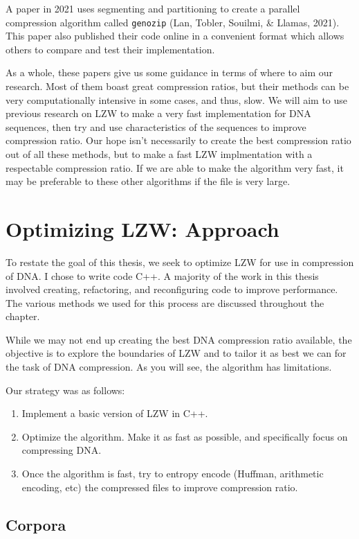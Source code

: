 \documentclass[12pt,twoside]{reedthesis}
\providecommand{\tightlist}{%
  \setlength{\itemsep}{0pt}\setlength{\parskip}{0pt}}
\begin{document}
A paper in 2021 uses segmenting and partitioning to create a parallel compression algorithm called \texttt{genozip} (Lan, Tobler, Souilmi, \& Llamas, 2021). This paper also published their code online in a convenient format which allows others to compare and test their implementation.

As a whole, these papers give us some guidance in terms of where to aim our research. Most of them boast great compression ratios, but their methods can be very computationally intensive in some cases, and thus, slow. We will aim to use previous research on LZW to make a very fast implementation for DNA sequences, then try and use characteristics of the sequences to improve compression ratio. Our hope isn't necessarily to create the best compression ratio out of all these methods, but to make a fast LZW implmentation with a respectable compression ratio. If we are able to make the algorithm very fast, it may be preferable to these other algorithms if the file is very large.

\hypertarget{optimizing-lzw-approach}{%
\chapter{Optimizing LZW: Approach}\label{optimizing-lzw-approach}}

To restate the goal of this thesis, we seek to optimize LZW for use in compression of DNA. I chose to write code C++. A majority of the work in this thesis involved creating, refactoring, and reconfiguring code to improve performance. The various methods we used for this process are discussed throughout the chapter.

While we may not end up creating the best DNA compression ratio available, the objective is to explore the boundaries of LZW and to tailor it as best we can for the task of DNA compression. As you will see, the algorithm has limitations.

Our strategy was as follows:
\begin{enumerate}
\def\labelenumi{\arabic{enumi}.}
\tightlist
\item
  Implement a basic version of LZW in C++.
\item
  Optimize the algorithm. Make it as fast as possible, and specifically focus on compressing DNA.
\item
  Once the algorithm is fast, try to entropy encode (Huffman, arithmetic encoding, etc) the compressed files to improve compression ratio.
\end{enumerate}
\hypertarget{corpora}{%
\section{Corpora}\label{corpora}}
\end{document}
